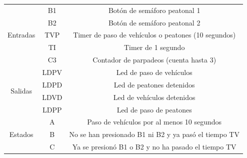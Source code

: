 \begin{table}[H]
\centering
\renewcommand{\arraystretch}{1.25}
\begin{tabular}{|c|c|c|}
\hline
\multirow{5}{*}{Entradas} & B1   & Botón de semáforo peatonal 1                                                                                             \\ \cline{2-3} 
                          & B2   & Botón de semáforo peatonal 2                                                                                             \\ \cline{2-3} 
                          & TVP  & Timer de paso de vehículos o peatones (10 segundos)                                                                      \\ \cline{2-3} 
                          & TI   & Timer de 1 segundo                                                                                                       \\ \cline{2-3} 
                          & C3   & Contador de parpadeos (cuenta hasta 3)                                                                                   \\ \hline
\multirow{4}{*}{Salidas}  & LDPV & Led de paso de vehículos                                                                                                 \\ \cline{2-3} 
                          & LDPD & Led de peatones detenidos                                                                                                \\ \cline{2-3} 
                          & LDVD & Led de vehículos detenidos                                                                                               \\ \cline{2-3} 
                          & LDPP & Led de paso de peatones                                                                                                  \\ \hline
\multirow{8}{*}{Estados}  & A    & Paso de vehículos por al menos 10 segundos                                                                               \\ \cline{2-3} 
                          & B    & No se han presionado B1 ni B2 y ya pasó el tiempo TV                                                                     \\ \cline{2-3} 
                          & C    & Ya se presionó B1 o B2 y no ha pasado el tiempo TV                                                                       \\ \cline{2-3} 

\end{tabular}
\end{table}
